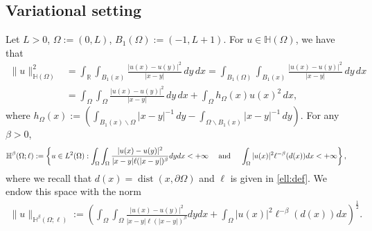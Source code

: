 \documentclass[11 pt]{article}
\numberwithin{equation}{section}
\newcommand{\weH}[1]{\mathbb H^{#1}(\Omega;\ell)}
\def\R{\mathbb{R}}
\def\mH{\mathbb{H}}
\begin{document}
\subsection{Variational setting}
Let $L>0$, $\Omega:=(0,L)$, $B_1(\Omega):=(-1,L+1)$. For $u\in \mH(\Omega)$, we have that
\begin{align*}
    \|u\|^2_{\mathbb H(\Omega)}&=\int_{\R}\int_{B_1(x)}\frac{|u(x)-u(y)|^2}{|x-y|}\, dy\, dx
    =\int_{B_1(\Omega)}\int_{B_1(x)}\frac{|u(x)-u(y)|^2}{|x-y|}\, dy\, dx\\
    &=\int_\Omega\int_\Omega \frac{|u(x)-u(y)|^2}{|x-y|}\, dy\, dx+\int_{\Omega}h_\Omega(x)u(x)^2\, dx,
\end{align*}
where $h_\Omega(x):=\left(\int_{B_1(x)\backslash \Omega}|x-y|^{-1}\, dy - \int_{\Omega\backslash B_1(x)}|x-y|^{-1}\, dy\right).$ For any $\beta>0$,
%
\begin{align}
    \weH{\beta}&:=\left\{ u\in L^2(\Omega): \int_{\Omega}\int_{\Omega}\frac{|u(x)-u(y)|^2}{|x-y|\ell(|x-y|)^{\beta}}dydx<+\infty \quad\textnormal{ and }\quad  \int_{\Omega}|u(x)|^2\ell^{-\beta}(d(x))dx <+\infty\right\},\label{H:weights:def}
\end{align}
where we recall that $d(x)=\operatorname{dist}(x,\partial \Omega)$ and $\ell$ is given in \eqref{ell:def}.  We endow this space with the norm
\begin{align}\label{Hbetanorm}
 \|u\|_{\mathbb H^\beta(\Omega;\ell)}:=\left(
 \int_{\Omega}\int_{\Omega}\frac{|u(x)-u(y)|^2}{|x-y|\ell(|x-y|)^{\beta}}dydx+\int_{\Omega}|u(x)|^2\ell^{-\beta}(d(x))dx
 \right)^\frac{1}{2}.
\end{align}
\end{document}
